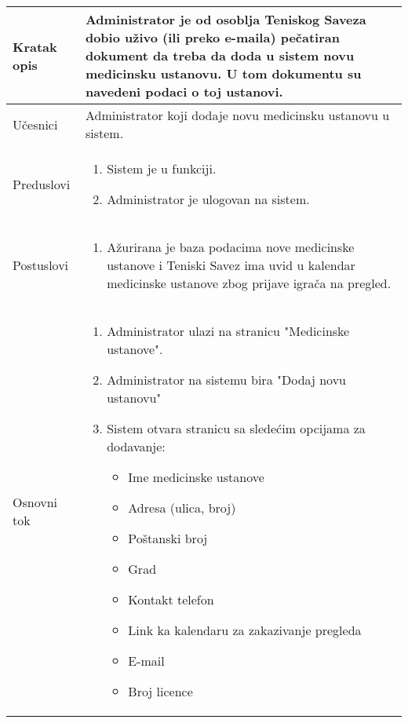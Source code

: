 \documentclass{article}
\begin{document}
        \begin{longtable}{| p{} | p{} |} 
            \hline
                Kratak opis & Administrator je od osoblja Teniskog Saveza dobio uživo (ili preko e-maila) pečatiran dokument da treba da doda u sistem novu medicinsku ustanovu. U tom dokumentu su navedeni podaci o toj ustanovi. \\ 
            \hline    
                Učesnici & Administrator koji dodaje novu medicinsku ustanovu u sistem. \\
            \hline
               Preduslovi & \begin{enumerate}
                   \item Sistem je u funkciji.
                   \item Administrator je ulogovan na sistem.
               \end{enumerate}\\
            \hline  
                Postuslovi & \begin{enumerate}
                    \item Ažurirana je baza podacima nove medicinske ustanove i Teniski Savez ima uvid u kalendar medicinske ustanove zbog prijave igrača na pregled.
                \end{enumerate}\\
            \hline
                Osnovni tok & \begin{enumerate}
                    \item Administrator ulazi na stranicu "Medicinske ustanove".
                    \item Administrator na sistemu bira "Dodaj novu ustanovu"
                    \item Sistem otvara stranicu sa sledećim opcijama za dodavanje:
                    \begin{itemize}
                        \item Ime medicinske ustanove
                        \item Adresa (ulica, broj)
                        \item Poštanski broj
                        \item Grad
                        \item Kontakt telefon
                        \item Link ka kalendaru za zakazivanje pregleda
                        \item E-mail
                        \item Broj licence

\end{itemize}
\end{enumerate}
\end{longtable}
\end{document}
